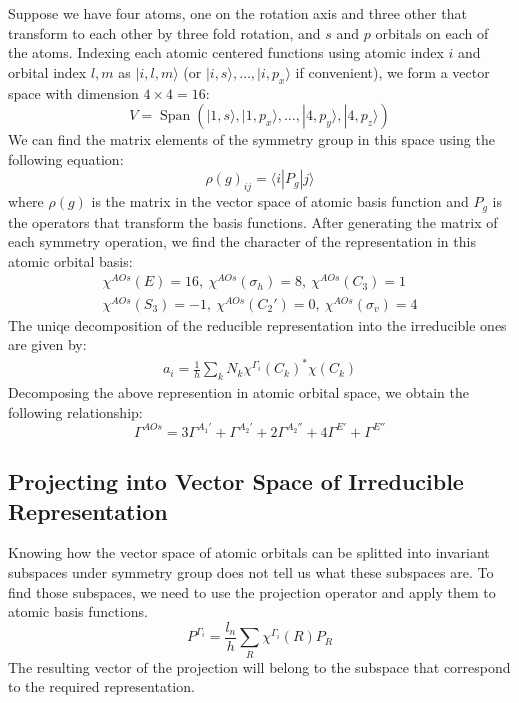 \documentclass{article}
\DeclareMathOperator{\spn}{Span}
\begin{document}
Suppose we have four atoms, one on the rotation axis and three other that transform to each other 
by three fold rotation, and $s$ and $p$ orbitals on each of the atoms. Indexing each atomic 
centered functions using atomic index $i$ and orbital index $l,m$ as $| i,l,m \rangle$ 
(or $| i,s \rangle, \dots, |i,p_x\rangle$ if convenient), we form 
a vector space with dimension $4\times4 = 16$:
\begin{equation}
    V = \spn(| 1,s \rangle, | 1,p_x \rangle ,\dots, | 4,p_y \rangle, | 4,p_z \rangle)
\end{equation}
We can find the matrix elements of the symmetry group in this space using the following equation:
\begin{equation}
    \rho(g)_{ij} = \langle i | P_g | j \rangle
\end{equation}
where $\rho(g)$ is the matrix in the vector space of atomic basis function and $P_g$ is the 
operators that transform the basis functions. 
After generating the matrix of each symmetry operation, we find the character of the representation
in this atomic orbital basis:
\begin{gather*}
    \chi^{AOs}(E) = 16,\ \chi^{AOs}(\sigma_h) = 8,\ \chi^{AOs}(C_3) = 1\\ 
    \chi^{AOs}(S_3) = -1,\ \chi^{AOs}(C_2') = 0,\ \chi^{AOs}(\sigma_v) = 4
\end{gather*}
The uniqe decomposition of the reducible representation into the irreducible ones are given by:
\begin{gather}
    a_i = \frac{1}{h} \sum_{k} N_k \chi^{\Gamma_i}(C_k)^* \chi(C_k)
\end{gather}
Decomposing the above represention in atomic orbital space, we obtain the following relationship:
\begin{equation}
    \Gamma^{AOs} = 
      3\Gamma^{A_1'} + \Gamma^{A_2'}  + 2\Gamma^{A_2''} + 4\Gamma^{E'} + \Gamma^{E''}
\end{equation}

\subsection{Projecting into Vector Space of Irreducible Representation}
Knowing how the vector space of atomic orbitals can be splitted into invariant subspaces 
under symmetry group does not tell us what these subspaces are. 
To find those subspaces, we need to use the projection operator and apply them to atomic basis functions.
\begin{equation}
    P^{\Gamma_i} = \frac{l_n}{h}\sum_R \chi^{\Gamma_i}(R) P_R
\end{equation}
The resulting vector of the projection will belong to the 
subspace that correspond to the required representation. 
\end{document}
